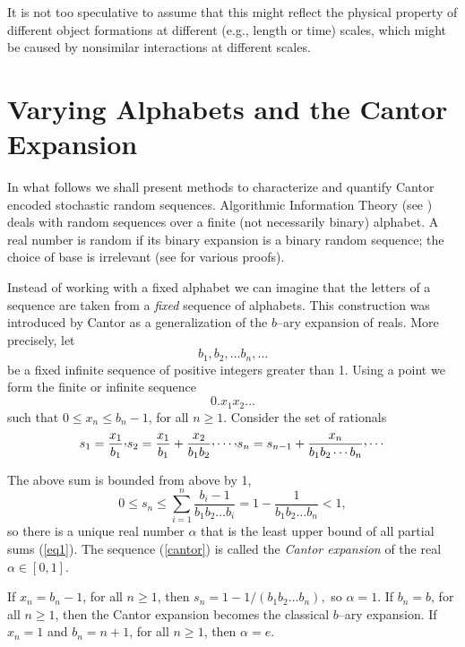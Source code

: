 \documentclass[12pt]{iopart}
\begin{document}
It is not too speculative to assume that this might reflect the physical
property
of different object formations at different (e.g., length or time) scales,
which might
be caused by nonsimilar interactions at different scales.


\section{Varying Alphabets and the Cantor Expansion}


In  what follows we shall present
methods to characterize and quantify Cantor encoded stochastic random sequences.
Algorithmic Information Theory (see \cite{chaitin3,chaitin:01,calude:02})
deals with random sequences over a finite (not necessarily binary)
alphabet. A real number is random if its binary expansion is
a binary random sequence; the choice of base is irrelevant
(see \cite{calude:02} for various proofs).


Instead of working with a fixed alphabet we can imagine that the letters of
a sequence are taken from a {\it fixed}
sequence of alphabets.  This construction was introduced by Cantor
as a generalization of the $b$--ary
expansion of reals.  More precisely, let
\[b_1, b_2, \ldots b_n, \ldots\]
be a fixed infinite sequence of positive integers greater than 1. Using a
point we form the finite or infinite sequence
\begin{equation}
\label{cantor}
0.x_{1}x_{2} \ldots
\end{equation}
such that  $0 \le x_n \le b_n-1$, for all $n\ge 1$. Consider the set of
rationals
\begin{equation}
\label{eq1}
s_1 = \frac{x_1}{b_1}  \raisebox{.5ex}{,}  s_2 = \frac{x_1}{b_1} +
\frac{x_2}{b_1b_2}
\raisebox{.5ex}{,}  \cdots \raisebox{.5ex}{,}  s_n =
s_{n-1} + \frac{x_n}{b_1 b_2 \cdots b_n}\raisebox{.5ex}{,} \cdots
\end{equation}

The above sum is bounded from above by 1,
\[0 \le s_n \le \sum_{i=1}^n \frac{b_i - 1}{b_1 b_2 \ldots b_i} = 1 -
\frac{1}{b_1 b_2 \ldots b_n} < 1,\]
so there is a unique real number $\alpha$ that is the least upper bound of
all partial sums (\ref{eq1}). The sequence (\ref{cantor}) is called the {\it
Cantor  expansion}
of the real $\alpha \in [0,1]$.


If $x_n = b_n -1$, for all $n \ge 1$, then $s_n = 1 -
1/(b_1 b_2 \ldots b_n),$ so $\alpha =1$.
If $b_n = b$, for all $n\ge 1$, then the Cantor expansion becomes the
classical $b$--ary expansion. If $x_n =1$ and $b_n = n+1$, for all $n \ge
1$, then $\alpha = e$.
\end{document}
